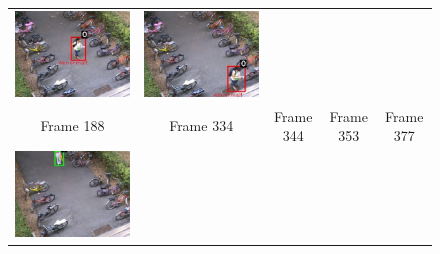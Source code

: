 \begin{figure}[t]
\begin{tabular}{ccccc}
    \includegraphics[scale=0.24]{figures/case-2-suspicious-0353} &
    \includegraphics[scale=0.24]{figures/case-2-suspicious-0377} \\
    \small Frame 188 & 
    \small Frame 334 & 
    \small Frame 344 & 
    \small Frame 353 & 
    \small Frame 377 \\
    \includegraphics[scale=0.24]{figures/case-3-suspicious-0173} &

\end{tabular}
\end{figure}
